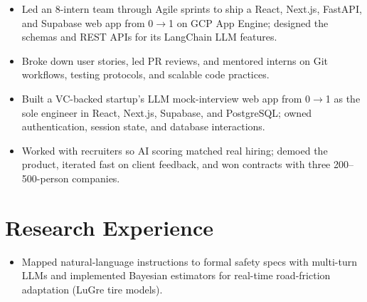 \documentclass[11pt, letterpaper]{article}
\begin{document}
\vspace{1pt}
\begin{itemize}
  \item Led an 8-intern team through Agile sprints to ship a React, Next.js, FastAPI, and Supabase web app from 0$\to$1 on GCP App Engine; designed the schemas and REST APIs for its LangChain LLM features.
  \item Broke down user stories, led PR reviews, and mentored interns on Git workflows, testing protocols, and scalable code practices.
\end{itemize}

\vspace{1pt}
\begin{itemize}
  \item Built a VC-backed startup's LLM mock-interview web app from 0$\to$1 as the sole engineer in React, Next.js, Supabase, and PostgreSQL; owned authentication, session state, and database interactions.
  \item Worked with recruiters so AI scoring matched real hiring; demoed the product, iterated fast on client feedback, and won contracts with three 200--500-person companies.
\end{itemize}

\section{Research Experience}
\begin{itemize}
  \item Mapped natural-language instructions to formal safety specs with multi-turn LLMs and implemented Bayesian estimators for real-time road-friction adaptation (LuGre tire models).
\end{itemize}
\end{document}
